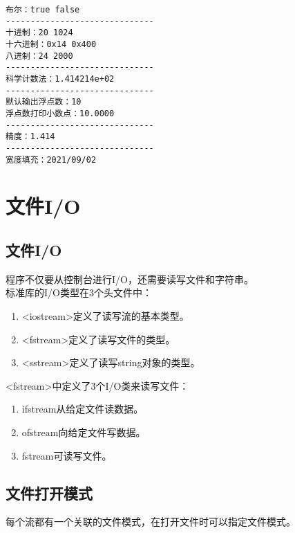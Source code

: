 \begin{tcolorbox}
	\begin{verbatim}
布尔：true false
------------------------------
十进制：20 1024
十六进制：0x14 0x400
八进制：24 2000
------------------------------
科学计数法：1.414214e+02
------------------------------
默认输出浮点数：10
浮点数打印小数点：10.0000
------------------------------
精度：1.414
------------------------------
宽度填充：2021/09/02
	\end{verbatim}
\end{tcolorbox}

\newpage

\section{文件I/O}

\subsection{文件I/O}

程序不仅要从控制台进行I/O，还需要读写文件和字符串。 \\

标准库的I/O类型在3个头文件中：

\begin{enumerate}
	\item <iostream>定义了读写流的基本类型。
	\item <fstream>定义了读写文件的类型。
	\item <sstream>定义了读写string对象的类型。
\end{enumerate}

<fstream>中定义了3个I/O类来读写文件：

\begin{enumerate}
	\item ifstream从给定文件读数据。
	\item  ofstream向给定文件写数据。
	\item fstream可读写文件。
\end{enumerate}

\subsection{文件打开模式}

每个流都有一个关联的文件模式，在打开文件时可以指定文件模式。

